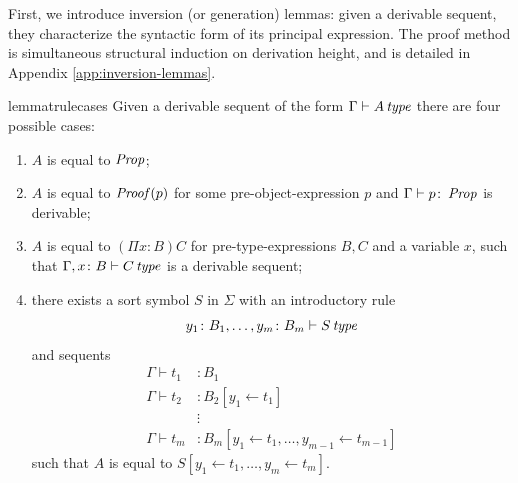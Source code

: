 First, we introduce inversion (or generation) lemmas: given a derivable sequent, they characterize the syntactic form of its principal expression. The proof method is simultaneous structural induction on derivation height, and is detailed in Appendix \ref{app:inversion-lemmas}.
\begin{restatable}{lemma}{trulecases} \label{lemma:t-rule-cases}
    Given a derivable sequent of the form $\Gamma \vdash A \operatorname{\mathit{\space type}}$ there are four possible cases:
    \begin{enumerate}
        \item $A$ is equal to $\operatorname{\mathit{Prop}}$;
        \item $A$ is equal to $\operatorname{\mathit{Proof}}(p)$ for some pre-object-expression $p$ and $\Gamma \vdash p \colon \operatorname{\mathit{Prop}}$ is derivable;
        \item $A$ is equal to $(\Pi x \colon B) C$ for pre-type-expressions $B, C$ and a variable $x$, such that $\Gamma, x \colon B \vdash C \operatorname{\mathit{\space type}}$ is a derivable sequent;
        \item there exists a sort symbol $S$ in $\Sigma$ with an introductory rule $$y_1 \colon B_1, \dots, y_m \colon B_m \vdash S \operatorname{\mathit{\space type}}$$ and sequents 
            \begin{align*}
                \Gamma \vdash t_1 &\colon B_1 \\
                \Gamma \vdash t_2 &\colon B_2[y_1 \leftarrow t_1] \\
                &\vdots \\
                \Gamma \vdash t_m &\colon B_m[y_1 \leftarrow t_1, \dots, y_{m-1} \leftarrow t_{m-1}]
            \end{align*}
            such that $A$ is equal to $S[y_1 \leftarrow t_1, \dots, y_m \leftarrow t_m]$.
    \end{enumerate}
\end{restatable}

